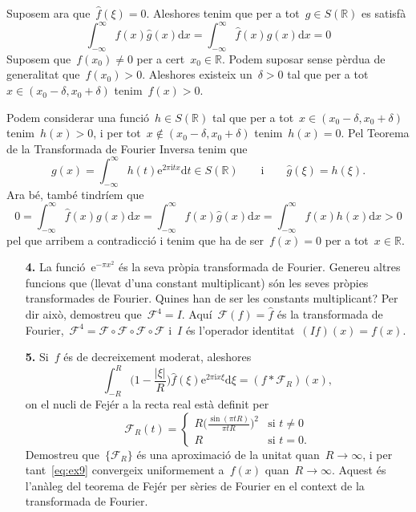 \documentclass[a4paper]{article}
\theoremstyle{definition}
\newcommand{\iu}{\mathrm{i}}
\newcommand{\e}{\mathrm{e}}
\newcommand{\uppi}{\pi}
\newcommand{\diff}{\mathrm{d}}
\newcommand{\abs}[1]{\lvert{#1}\rvert}
\newcommand{\F}{\mathcal{F}}
\newcommand{\conv}{\mathop{\ast}}
\begin{document}
Suposem ara que~\(\widehat{f}(\xi) = 0\).
Aleshores tenim que per a tot~\(g\in S(\mathbb{R})\) es satisfà
\[
    \int_{-\infty}^{\infty} f(x)\widehat{g}(x) \diff x
    = \int_{-\infty}^{\infty} \widehat{f}(x) g(x) \diff x
    = 0
\]
Suposem que~\(f(x_{0}) \neq 0\) per a cert~\(x_{0}\in\mathbb{R}\).
Podem suposar sense pèrdua de generalitat que~\(f(x_{0}) > 0\).
Aleshores existeix un~\(\delta>0\) tal que per a
tot~\(x\in(x_{0}-\delta,x_{0}+\delta)\) tenim~\(f(x) > 0\).

Podem considerar una funció~\(h\in S(\mathbb{R})\) tal que per a
tot~\(x\in(x_{0}-\delta,x_{0}+\delta)\) tenim~\(h(x) > 0\), i per
tot~\(x\notin(x_{0}-\delta,x_{0}+\delta)\) tenim~\(h(x) = 0\).
Pel Teorema de la Transformada de Fourier Inversa tenim que
\[
    g(x)=\int_{-\infty}^{\infty}h(t)\e^{2\uppi\iu tx}\diff t\in S(\mathbb{R})
    \qquad\text{i}\qquad
    \widehat{g}(\xi) = h(\xi).
\]
Ara bé, també tindríem que
\[
    0
    = \int_{-\infty}^{\infty} \widehat{f}(x) g(x) \diff x
    = \int_{-\infty}^{\infty} f(x)\widehat{g}(x) \diff x
    = \int_{-\infty}^{\infty} f(x)h(x) \diff x
    > 0
\]
pel que arribem a contradicció i tenim que ha de ser~\(f(x) = 0\) per a
tot~\(x\in\mathbb{R}\).

\begin{enumerate}
    \item[\textbf{4.}] La funció~\(\e^{-\uppi x^{2}}\) és la seva pròpia
        transformada de Fourier.
        Genereu altres funcions que (llevat d'una constant multiplicant) són les
        seves pròpies transformades de Fourier.
        Quines han de ser les constants multiplicant?
        Per dir això, demostreu que~\(\F^{4} = I\).
        Aquí~\(\F(f) = \widehat{f}\) és la transformada de Fourier,~\(\F^{4} =
        \F\circ\F\circ\F\circ\F\) i~\(I\) és l'operador identitat~\((If)(x) =
        f(x)\).
\end{enumerate}

\begin{enumerate}
    \item[\textbf{5.}] Si~\(f\) és de decreixement moderat, aleshores
        \begin{equation}
            \label{eq:ex9}
            \int_{-R}^{R}\biggl(1 - \frac{\abs{\xi}}{R}\biggr)
            \widehat{f}(\xi)\e^{2\uppi\iu x\xi}\diff\xi
            = (f\conv\F_{R})(x),
        \end{equation}
        on el nucli de Fejér a la recta real està definit per
        \[
            \F_{R}(t) = \begin{cases}\displaystyle
                R\biggl(\frac{\sin(\uppi tR)}{\uppi tR}\biggr)^{2}
                & \text{si } t \neq 0 \\
                R & \text{si } t = 0.
            \end{cases}
        \]
        Demostreu que~\(\{\F_{R}\}\) és una aproximació de la unitat
        quan~\(R\to\infty\), i per tant~\ref{eq:ex9} convergeix uniformement
        a~\(f(x)\) quan~\(R\to\infty\).
        Aquest és l'anàleg del teorema de Fejér per sèries de Fourier en el
        context de la transformada de Fourier.
\end{enumerate}
\end{document}

